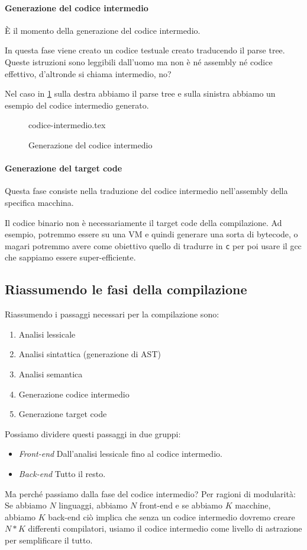 \documentclass[class=book, crop=false, oneside, 12pt]{standalone}
\begin{document}
\paragraph{Generazione del codice intermedio}
È il momento della generazione del codice intermedio.

In questa fase viene creato un codice testuale creato traducendo il parse tree. Queste istruzioni sono leggibili dall’uomo ma non è né assembly né codice effettivo, d’altronde si chiama intermedio, no?

Nel caso in \ref{codice_intermedio} sulla destra abbiamo il parse tree e sulla sinistra abbiamo un esempio del codice intermedio generato.
\begin{figure}[H]
	\centering
	{codice-intermedio.tex}
	\caption{Generazione del codice intermedio}
	\label{codice_intermedio}
\end{figure}

\paragraph{Generazione del target code}
Questa fase consiste nella traduzione del codice intermedio nell’assembly della specifica macchina.

Il codice binario non è necessariamente il target code della compilazione. Ad esempio, potremmo essere su una VM e quindi generare una sorta di bytecode, o magari potremmo avere come obiettivo quello di tradurre in \texttt{c} per poi usare il gcc che sappiamo essere super-efficiente.


\subsection{Riassumendo le fasi della compilazione}
Riassumendo i passaggi necessari per la compilazione sono:
\begin{enumerate}
    \item Analisi lessicale
    \item Analisi sintattica (generazione di AST)
    \item Analisi semantica
    \item Generazione codice intermedio
    \item Generazione target code
\end{enumerate}
Possiamo dividere questi passaggi in due gruppi:
\begin{itemize}[]
    \item \emph{Front-end} Dall’analisi lessicale fino al codice intermedio.
    \item \emph{Back-end} Tutto il resto.
\end{itemize}

Ma perché passiamo dalla fase del codice intermedio? Per ragioni di modularità:
Se abbiamo \(N\) linguaggi, abbiamo \(N\) front-end e se abbiamo \(K\) macchine, abbiamo \(K\) back-end ciò implica che senza un codice intermedio dovremo creare \(N*K\) differenti compilatori, usiamo il codice intermedio come livello di astrazione per semplificare il tutto. 
\end{document}
